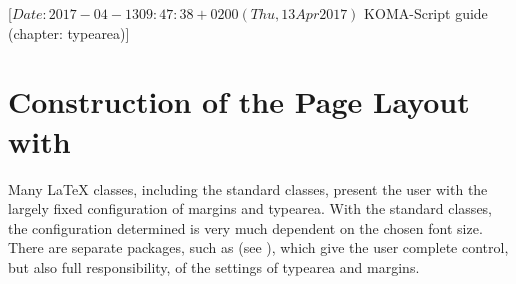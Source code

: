%
%
%
%
%
%
%
%
% 
%
%
%
%

%
                 [$Date: 2017-04-13 09:47:38 +0200 (Thu, 13 Apr 2017) $
                  KOMA-Script guide (chapter: typearea)]


\chapter{Construction of the Page Layout with }
\BeginIndexGroup
{}

Many {\LaTeX} classes, including the standard classes, present the user
with the largely fixed configuration of margins and typearea. With the
standard classes, the configuration determined is very much dependent
on the chosen font size. There are
separate packages, such as
 (see
\cite{package:geometry}), which give the user complete control, but
also full responsibility, of the settings of typearea and margins.

